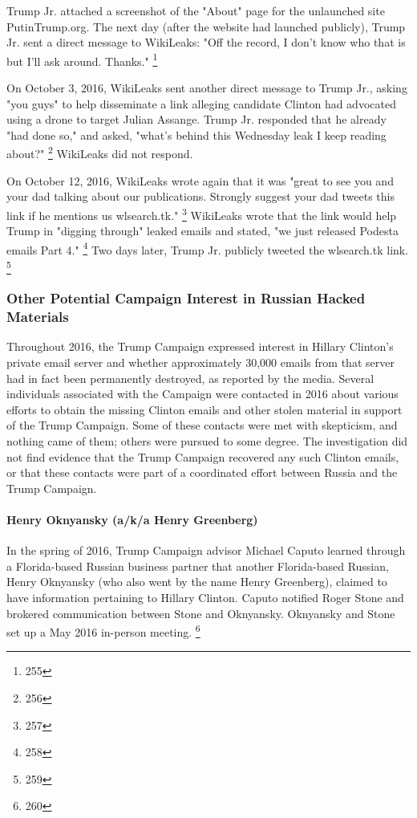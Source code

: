 Trump Jr. attached a screenshot of the "About" page for the unlaunched site PutinTrump.org.
The next day (after the website had launched publicly), Trump Jr. sent a direct message to WikiLeaks:
"Off the record, I don't know who that is but I'll ask around. Thanks."%
\footnote{255}

On October 3, 2016, WikiLeaks sent another direct message to Trump Jr., asking "you guys" to help disseminate a link alleging candidate Clinton had advocated using a drone to target Julian Assange.
Trump Jr. responded that he already "had done so," and asked, "what's behind this Wednesday leak I keep reading about?"%
\footnote{256}
WikiLeaks did not respond.

On October 12, 2016, WikiLeaks wrote again that it was "great to see you and your dad talking about our publications.
Strongly suggest your dad tweets this link if he mentions us wlsearch.tk."%
\footnote{257}
WikiLeaks wrote that the link would help Trump in "digging through" leaked emails and stated, "we just released Podesta emails Part 4."%
\footnote{258}
Two days later, Trump Jr. publicly tweeted the wlsearch.tk link.%
\footnote{259}

\subsubsection{Other Potential Campaign Interest in Russian Hacked Materials}

Throughout 2016, the Trump Campaign expressed interest in Hillary Clinton's private email server and whether approximately 30,000 emails from that server had in fact been permanently destroyed, as reported by the media.
Several individuals associated with the Campaign were contacted in 2016 about various efforts to obtain the missing Clinton emails and other stolen material in support of the Trump Campaign.
Some of these contacts were met with skepticism, and nothing came of them; others were pursued to some degree.
The investigation did not find evidence that the Trump Campaign recovered any such Clinton emails, or that these contacts were part of a coordinated effort between Russia and the Trump Campaign.

\paragraph{Henry Oknyansky (a/k/a Henry Greenberg)}

In the spring of 2016, Trump Campaign advisor Michael Caputo learned through a Florida-based Russian business partner that another Florida-based Russian, Henry Oknyansky (who also went by the name Henry Greenberg), claimed to have information pertaining to Hillary Clinton.
Caputo notified Roger Stone and brokered communication between Stone and Oknyansky.
Oknyansky and Stone set up a May 2016 in-person meeting.%
\footnote{260}

